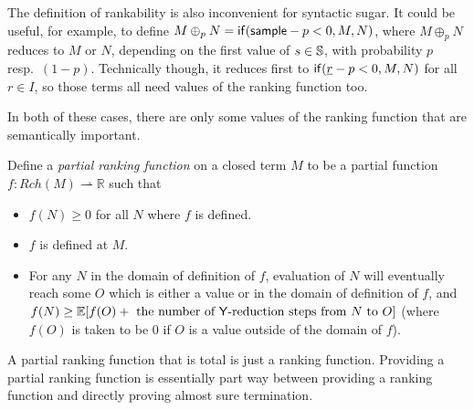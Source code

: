 The definition of rankability is also inconvenient for syntactic sugar. It could be useful, for example, to define $M \oplus_p N = \mathsf{if}(\mathsf{sample} - p < 0, M, N)$, where $M \oplus_p N$ reduces to $M$ or $N$, depending on the first value of $s \in {\mathbb{S}}$, with probability $p$ resp.~$(1-p)$. Technically though, it reduces first to $\mathsf{if}(\underline r - p < 0, M, N)$ for all $r \in I$, so those terms all need values of the ranking function too.

In both of these cases, there are only some values of the ranking function that are semantically important. 
\begin{definition}
Define a \emph{partial ranking function} on a closed term $M$ to be a partial function $f : Rch(M) \rightharpoonup \mathbb R$ such that
\begin{itemize}
    \item $f(N) \geq 0$ for all $N$ where $f$ is defined.
    \item $f$ is defined at $M$.
    \item For any $N$ in the domain of definition of $f$, evaluation of $N$ will eventually  reach some $O$ which is either a value or in the domain of definition of $f$, and $f(N) \geq \mathbb E[f(O) + \text{ the number of $\mathsf{Y}$-reduction steps from $N$ to $O$}]$ (where $f(O)$ is taken to be 0 if $O$ is a value outside of the domain of $f$).
\end{itemize}
\end{definition}
A partial ranking function that is total is just a ranking function. Providing a partial ranking function is essentially part way between providing a ranking function and directly proving almost sure termination.

